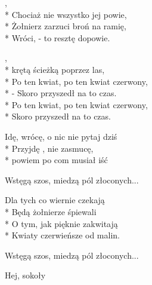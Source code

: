 \begin{lyrics}[longestline={Po ten kwiat, po ten kwiat czerwony,}]

,\\*
Chociaż nie wszystko jej powie,\\*
Żołnierz zarzuci broń na ramię,\\*
Wróci, - to resztę dopowie.

\begin{chorus}
,\\*
krętą ścieżką poprzez las,\\*
Po ten kwiat, po ten kwiat czerwony,\\*
- Skoro przyszedł na to czas.\\*
Po ten kwiat, po ten kwiat czerwony,\\*
Skoro przyszedł na to czas.
\end{chorus}

Idę, wrócę, o nic nie pytaj dziś\\*
Przyjdę , nie zasmucę,\\*
powiem po com musiał iść

\chorusref

Wstęgą szos, miedzą pól złoconych...

Dla tych co wiernie czekają\\*
Będą żołnierze śpiewali\\*
O tym, jak pięknie zakwitają\\*
Kwiaty czerwieńsze od malin.

\chorusref

Wstęgą szos, miedzą pól złoconych...
\end{lyrics}



\song
{Hej, sokoły}

